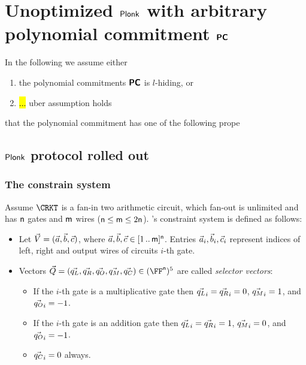 \documentclass[runningheads,11pt]{llncs}
\let\spvec\vec \let\vec\accentvec
\let\vec\spvec
\begin{document}
\section{Unoptimized $\textnormal{\textsf{Plonk}}$ with arbitrary polynomial commitment $\bm{\mathsf{PC}}$}
 In the following we assume either
 \begin{enumerate}
 \item the polynomial commitments $\bm{\mathsf{PC}}$ is $l$-hiding, or 
 \item \hl{...} uber assumption holds 
 \end{enumerate}
 that the polynomial commitment has one of the
 following prope
 \subsection{$\textnormal{\textsf{Plonk}}$ protocol rolled out}
\label{sec:plonk_explained}
\subsubsection{The constrain system}
Assume $\CRKT$ is a fan-in two arithmetic circuit,
which fan-out is unlimited and has $\mathsf{n}$ gates and $\mathsf{m}$ wires
($\mathsf{n} \leq \mathsf{m} \leq 2\mathsf{n}$). \plonk's constraint
system is defined as follows:
\begin{itemize}
\item Let $\vec{V} = (\va, \vb, \vc)$, where $\va, \vb, \vc
  \in \range{1}{\noofw}^\numberofconstrains$. Entries $\va_i, \vb_i, \vc_i$ represent indices of left,
  right and output wires of circuits $i$-th gate.
\item Vectors $\vec{Q} = (\vql, \vqr, \vqo, \vqm, \vqc) \in
  (\FF^\numberofconstrains)^5$ are called \emph{selector vectors}:
  \begin{itemize}
  \item If the $i$-th gate is a multiplicative gate then $\vql_i = \vqr_i = 0$,
    $\vqm_i = 1$, and $\vqo_i = -1$. 
  \item If the $i$-th gate is an addition gate then $\vql_i = \vqr_i  = 1$, $\vqm_i =
    0$, and $\vqo_i = -1$. 
  \item $\vqc_i = 0$ always. 
  \end{itemize}
\end{itemize}
\end{document}
